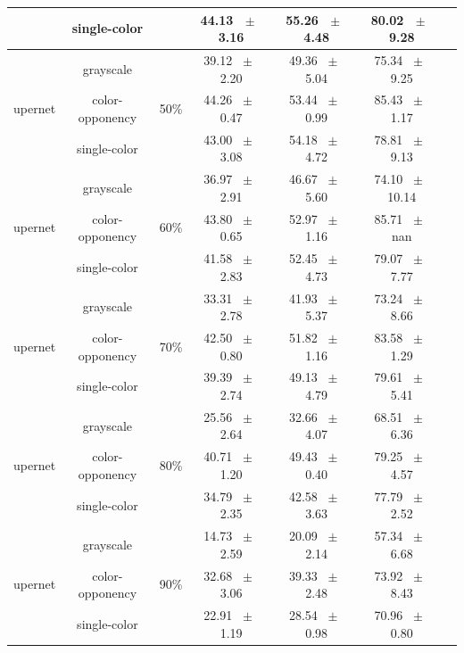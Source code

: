 \begin{table}[h]
\begin{tabular}{@{}lccc ccc@{}}
    & single-color &  & 44.13 ~$\pm$~ 3.16 & 55.26 ~$\pm$~ 4.48 & 80.02 ~$\pm$~ 9.28 \\
    \midrule
    \multirow{3}{*}{upernet} & grayscale & \multirow{3}{*}{50\%} & 39.12 ~$\pm$~ 2.20 & 49.36 ~$\pm$~ 5.04 & 75.34 ~$\pm$~ 9.25 \\
    & color-opponency &  & 44.26 ~$\pm$~ 0.47 & 53.44 ~$\pm$~ 0.99 & 85.43 ~$\pm$~ 1.17 \\
    & single-color &  & 43.00 ~$\pm$~ 3.08 & 54.18 ~$\pm$~ 4.72 & 78.81 ~$\pm$~ 9.13 \\
    \midrule
    \multirow{3}{*}{upernet} & grayscale & \multirow{3}{*}{60\%} & 36.97 ~$\pm$~ 2.91 & 46.67 ~$\pm$~ 5.60 & 74.10 ~$\pm$~ 10.14 \\
    & color-opponency &  & 43.80 ~$\pm$~ 0.65 & 52.97 ~$\pm$~ 1.16 & 85.71 ~$\pm$~ nan \\
    & single-color &  & 41.58 ~$\pm$~ 2.83 & 52.45 ~$\pm$~ 4.73 & 79.07 ~$\pm$~ 7.77 \\
    \midrule
    \multirow{3}{*}{upernet} & grayscale & \multirow{3}{*}{70\%} & 33.31 ~$\pm$~ 2.78 & 41.93 ~$\pm$~ 5.37 & 73.24 ~$\pm$~ 8.66 \\
    & color-opponency &  & 42.50 ~$\pm$~ 0.80 & 51.82 ~$\pm$~ 1.16 & 83.58 ~$\pm$~ 1.29 \\
    & single-color &  & 39.39 ~$\pm$~ 2.74 & 49.13 ~$\pm$~ 4.79 & 79.61 ~$\pm$~ 5.41 \\
    \midrule
    \multirow{3}{*}{upernet} & grayscale & \multirow{3}{*}{80\%} & 25.56 ~$\pm$~ 2.64 & 32.66 ~$\pm$~ 4.07 & 68.51 ~$\pm$~ 6.36 \\
    & color-opponency &  & 40.71 ~$\pm$~ 1.20 & 49.43 ~$\pm$~ 0.40 & 79.25 ~$\pm$~ 4.57 \\
    & single-color &  & 34.79 ~$\pm$~ 2.35 & 42.58 ~$\pm$~ 3.63 & 77.79 ~$\pm$~ 2.52 \\
    \midrule
    \multirow{3}{*}{upernet} & grayscale & \multirow{3}{*}{90\%} & 14.73 ~$\pm$~ 2.59 & 20.09 ~$\pm$~ 2.14 & 57.34 ~$\pm$~ 6.68 \\
    & color-opponency &  & 32.68 ~$\pm$~ 3.06 & 39.33 ~$\pm$~ 2.48 & 73.92 ~$\pm$~ 8.43 \\
    & single-color &  & 22.91 ~$\pm$~ 1.19 & 28.54 ~$\pm$~ 0.98 & 70.96 ~$\pm$~ 0.80 \\
    \midrule
    \bottomrule
  \end{tabular}
  \label{tab:sparse_results_upernet_acdc_fog}
\end{table}